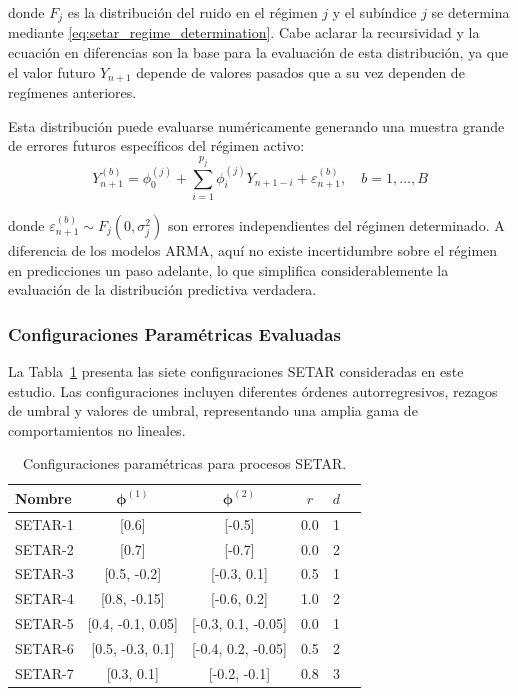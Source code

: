 donde $F_j$ es la distribución del ruido en el régimen $j$ y el subíndice $j$ se determina mediante \eqref{eq:setar_regime_determination}. Cabe aclarar la recursividad y la ecuación en diferencias son la base para la evaluación de esta distribución, ya que el valor futuro $Y_{n+1}$ depende de valores pasados que a su vez dependen de regímenes anteriores. 

Esta distribución puede evaluarse numéricamente generando una muestra grande de errores futuros específicos del régimen activo:
\begin{equation}
Y_{n+1}^{(b)} = \phi_0^{(j)} + \sum_{i=1}^{p_j} \phi_i^{(j)} Y_{n+1-i} + \varepsilon_{n+1}^{(b)}, \quad b = 1, \ldots, B
\label{eq:setar_monte_carlo_samples}
\end{equation}

donde $\varepsilon_{n+1}^{(b)} \sim F_j(0, \sigma_j^2)$ son errores independientes del régimen determinado. A diferencia de los modelos ARMA, aquí no existe incertidumbre sobre el régimen en predicciones un paso adelante, lo que simplifica considerablemente la evaluación de la distribución predictiva verdadera.

\subsubsection{Configuraciones Paramétricas Evaluadas}

La Tabla~\ref{tab:setar_configs} presenta las siete configuraciones SETAR consideradas en este estudio. Las configuraciones incluyen diferentes órdenes autorregresivos, rezagos de umbral y valores de umbral, representando una amplia gama de comportamientos no lineales.

\begin{table}[htbp]
\centering
\caption{Configuraciones paramétricas para procesos SETAR.}
\label{tab:setar_configs}
\small
\begin{tabular}{lccccl}
\toprule
\textbf{Nombre} & \textbf{$\boldsymbol{\phi}^{(1)}$} & \textbf{$\boldsymbol{\phi}^{(2)}$} & \textbf{$r$} & \textbf{$d$}  \\
\midrule
SETAR-1 & [0.6] & [-0.5] & 0.0 & 1 \\
SETAR-2 & [0.7] & [-0.7] & 0.0 & 2 \\
SETAR-3 & [0.5, -0.2] & [-0.3, 0.1] & 0.5 & 1 \\
SETAR-4 & [0.8, -0.15] & [-0.6, 0.2] & 1.0 & 2 \\
SETAR-5 & [0.4, -0.1, 0.05] & [-0.3, 0.1, -0.05] & 0.0 & 1 \\
SETAR-6 & [0.5, -0.3, 0.1] & [-0.4, 0.2, -0.05] & 0.5 & 2 \\
SETAR-7 & [0.3, 0.1] & [-0.2, -0.1] & 0.8 & 3 \\
\bottomrule
\end{tabular}
\end{table}

